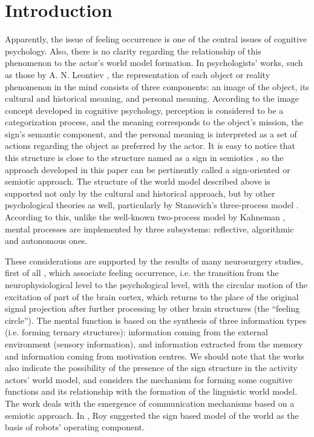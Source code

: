 \documentclass[12pt]{scrartcl}
\begin{document}
	\section*{Introduction}
	Apparently, the issue of feeling occurrence is one of the central issues of cognitive psychology. Also, there is no clarity regarding the relationship of this phenomenon to the actor’s world model formation. In psychologists’ works, such as those by A. N. Leontiev \cite{Leontiev2009,Igira2009}, the representation of each object or reality phenomenon in the mind consists of three components: an image of the object, its cultural and historical meaning, and personal meaning. According to the image concept developed in cognitive psychology, perception is considered to be a categorization process, and the meaning corresponds to the object’s mission, the sign’s semantic component, and the personal meaning is interpreted as a set of actions regarding the object as preferred by the actor. It is easy to notice that this structure is close to the structure named as a sign in semiotics \cite{Pierce2000b,Frege2000}, so the approach developed in this paper can be pertinently called a sign-oriented or semiotic approach. The structure of the world model described above is supported not only by the cultural and historical approach, but by other psychological theories as well, particularly by Stanovich’s three-process model \cite{Stanovich2009}. According to this, unlike the well-known two-process model by Kahneman \cite{Kahneman2011}, mental processes are implemented by three subsystems: reflective, algorithmic and autonomous ones.
	
	These considerations are supported by the results of many neurosurgery studies, first of all \cite{Ivanitsky1996}, which associate feeling occurrence, i.e. the transition from the neurophysiological level to the psychological level, with the circular motion of the excitation of part of the brain cortex, which returns to the place of the original signal projection after further processing by other brain structures (the ``feeling circle''). The mental function \cite{Ivanitsky2010} is based on the synthesis of three information types (i.e. forming ternary structures): information coming from the external environment (sensory information), and information extracted from the memory and information coming from motivation centres. We should note that the works \cite{Edelmen1981} also indicate the possibility of the presence of the sign structure in the activity actors’ world model, and \cite{Friederici2015} considers the mechanism for forming some cognitive functions and its relationship with the formation of the linguistic world model. The work \cite{Loula2012} deals with the emergence of communication mechanisms based on a semiotic approach. In \cite{Roy2005}, Roy suggested the sign based model of the world as the basis of robots’ operating component.
	
\end{document}
